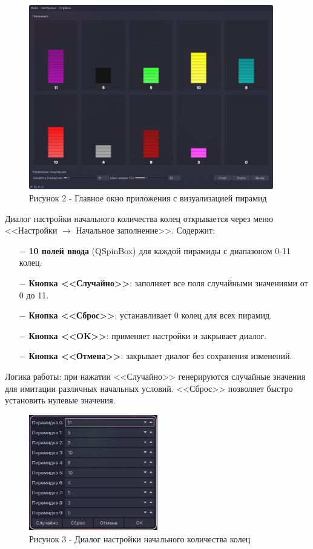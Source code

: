 \documentclass[oneside,a4paper,14pt]{extarticle}
\begin{document}
\begin{figure}[H]
  \centering
  \includegraphics[width=0.95\textwidth]{pics/main_window.png}
  \caption*{Рисунок 2 - Главное окно приложения с визуализацией пирамид}
\end{figure}

Диалог настройки начального количества колец открывается через меню <<Настройки $\rightarrow$ Начальное заполнение>>. Содержит:

\begin{itemize}
  \item[$-$] \textbf{10 полей ввода} (QSpinBox) для каждой пирамиды с диапазоном 0-11 колец.
  \item[$-$] \textbf{Кнопка <<Случайно>>}: заполняет все поля случайными значениями от 0 до 11.
  \item[$-$] \textbf{Кнопка <<Сброс>>}: устанавливает 0 колец для всех пирамид.
  \item[$-$] \textbf{Кнопка <<OK>>}: применяет настройки и закрывает диалог.
  \item[$-$] \textbf{Кнопка <<Отмена>>}: закрывает диалог без сохранения изменений.
\end{itemize}

Логика работы: при нажатии <<Случайно>> генерируются случайные значения для имитации различных начальных условий. <<Сброс>> позволяет быстро установить нулевые значения.

\begin{figure}[H]
  \centering
  \includegraphics[width=0.5\textwidth]{pics/initial_fill_dialog.png}
  \caption*{Рисунок 3 - Диалог настройки начального количества колец}
\end{figure}
\end{document}

